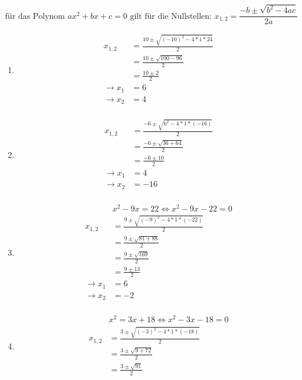 \begin{lsg}{}
  \begin{equation*}
    \text{für das Polynom $ax^2+bx+c=0$ gilt für die Nullstellen: } x_{1,2}=\frac{-b\pm\sqrt{b^2-4ac}}{2a}
  \end{equation*}
    \begin{enumerate}
      \item \begin{align*}
      x_{1,2}&=\frac{10\pm\sqrt{(-10)^2-4*1*24}}{2}\\
      &=\frac{10\pm\sqrt{100-96}}{2}\\
      &=\frac{10\pm2}{2}\\
      \rightarrow x_1&=6\\
      \rightarrow x_2&=4\\
      \end{align*}
      \item \begin{align*}
      x_{1,2}&=\frac{-6\pm\sqrt{6^2-4*1*(-16)}}{2}\\
      &=\frac{-6\pm\sqrt{36+64}}{2}\\
      &=\frac{-6\pm10}{2}\\
      \rightarrow x_1&=4\\
      \rightarrow x_2&=-16\\
      \end{align*}
      \item
      \begin{align*}
        &x^2 - 9x = 22 \Leftrightarrow x^2 - 9x - 22 = 0\\
        x_{1,2}&=\frac{9\pm\sqrt{(-9)^2-4*1*(-22)}}{2}\\
        &=\frac{9\pm\sqrt{81+88}}{2}\\
        &=\frac{9\pm\sqrt{169}}{2}\\
        &=\frac{9\pm13}{2}\\
        \rightarrow x_1&=6\\
        \rightarrow x_2&=-2\\
      \end{align*}
      \item
      \begin{align*}
        &x^2 = 3x + 18 \Leftrightarrow x^2 - 3x - 18 = 0\\
        x_{1,2}&=\frac{3\pm\sqrt{(-3)^2-4*1*(-18)}}{2}\\
        &=\frac{3\pm\sqrt{9+72}}{2}\\
        &=\frac{3\pm\sqrt{91}}{2}\\

\end{align*}
\end{enumerate}
\end{lsg}

